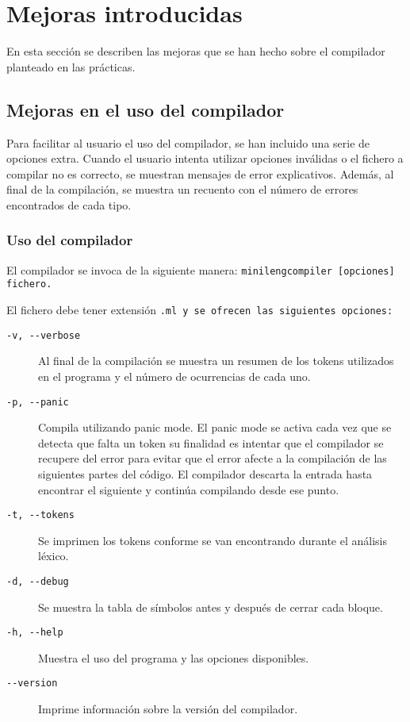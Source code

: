 \section{Mejoras introducidas}
En esta sección se describen las mejoras que se han hecho sobre el compilador planteado en las prácticas.

\subsection{Mejoras en el uso del compilador}
Para facilitar al usuario el uso del compilador, se han incluido una serie de opciones extra. Cuando el usuario intenta utilizar opciones inválidas o el fichero a compilar no es correcto, se muestran mensajes de error explicativos. Además, al final de la compilación, se muestra un recuento con el número de errores encontrados de cada tipo.

\subsubsection{Uso del compilador}
El compilador se invoca de la siguiente manera: \tt{minilengcompiler [opciones] fichero}.

El fichero debe tener extensión \tt{.ml} y se ofrecen las siguientes opciones:

\begin{description}
     \item[\tt{-v, -{}-verbose}] Al final de la compilación se muestra un resumen de los tokens utilizados en el programa y el número de ocurrencias de cada uno.
     \item[\tt{-p, -{}-panic}] Compila utilizando panic mode. El panic mode se activa cada vez que se detecta que falta un token \car{;} su finalidad es intentar que el compilador se recupere del error para evitar que el error afecte a la compilación de las siguientes partes del código. El compilador descarta la entrada hasta encontrar el siguiente \car{;} y continúa compilando desde ese punto.
     \item[\tt{-t, -{}-tokens}] Se imprimen los tokens conforme se van encontrando durante el análisis léxico.
     \item[\tt{-d, -{}-debug}] Se muestra la tabla de símbolos antes y después de cerrar cada bloque.
     \item[\tt{-h, -{}-help}] Muestra el uso del programa y las opciones disponibles.
     \item[\tt{-{}-version}] Imprime información sobre la versión del compilador.
\end{description}

